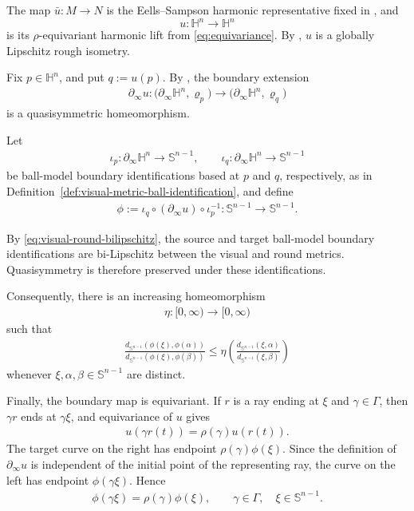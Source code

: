 \documentclass[11pt]{amsart}
\newcommand{\SuggestedDelete}[1]{{\hypersetup{linkcolor=red,citecolor=red,urlcolor=red}\color{red}#1}}
\newcommand{\ReviewUnusedLabel}[1]{%
  \par\noindent
  \SuggestedDelete{\textup{\scriptsize Unused label: \texttt{\detokenize{\label{#1}}}}}%
  \par}
\theoremstyle{plain}
\theoremstyle{plain}
\theoremstyle{plain}
\newcommand{\Hn}{\mathbb H^n}
\newcommand{\bdry}{\partial_\infty}
\numberwithin{equation}{section}
\begin{document}
The map \(\bar u:M\to N\) is the Eells--Sampson harmonic representative fixed in
, and
\[
u:\Hn\longrightarrow\Hn
\]
is its \(\rho\)-equivariant harmonic lift from
\eqref{eq:equivariance}.  By , \(u\) is a globally
Lipschitz rough isometry.  

Fix \(p\in\Hn\), and put \(q:=u(p)\). By
, the boundary extension
\begin{align}
\bdry u:
\bigl(\bdry\Hn,\varrho_p\bigr)
\longrightarrow
\bigl(\bdry\Hn,\varrho_q\bigr)
\nonumber
\end{align}
is a quasisymmetric homeomorphism.

Let
\begin{align}
\iota_p:\bdry\Hn\longrightarrow\mathbb S^{n-1},
\qquad
\iota_q:\bdry\Hn\longrightarrow\mathbb S^{n-1}
\nonumber
\end{align}
be ball-model boundary identifications based at \(p\) and \(q\),
respectively, as in
Definition~\ref{def:visual-metric-ball-identification}, and define
\begin{align}
\phi:=\iota_q\circ(\bdry u)\circ\iota_p^{-1}:\mathbb S^{n-1}\longrightarrow\mathbb S^{n-1}.
\label{eq:spherical-boundary-map}
\end{align}


By \eqref{eq:visual-round-bilipschitz}, the source and target ball-model
boundary identifications are bi-Lipschitz between the visual and round
metrics.  Quasisymmetry is therefore preserved under these identifications.

Consequently, there is an increasing homeomorphism
\begin{align}
\eta:[0,\infty)\longrightarrow[0,\infty)
\nonumber
\end{align}
such that
\begin{align}
\frac{d_{ \mathbb{S}^{n-1}}(\phi(\xi),\phi(\alpha))}
     {d_{ \mathbb{S}^{n-1}}(\phi(\xi),\phi(\beta))}
\leq
\eta\!\left(
\frac{d_{ \mathbb{S}^{n-1}}(\xi,\alpha)}{d_{ \mathbb{S}^{n-1}}(\xi,\beta)}
\right)
\label{eq:qs_sphere}
\end{align}
whenever \(\xi,\alpha,\beta\in \mathbb{S}^{n-1}\) are distinct.

Finally, the boundary map is equivariant.  If \(r\) is a ray ending at
\(\xi\) and $\gamma\in \Gamma$, then \(\gamma r\) ends at \(\gamma\xi\), and equivariance of
\(u\) gives
\begin{align}
u(\gamma r(t))=\rho(\gamma)u(r(t)).
\nonumber
\end{align}
The target curve on the right has endpoint
\(\rho(\gamma)\phi(\xi)\).  Since the definition of \(\bdry u\) is
independent of the initial point of the representing ray, the curve on
the left has endpoint \(\phi(\gamma\xi)\).  Hence
\begin{align}
\phi(\gamma\xi)=\rho(\gamma)\phi(\xi),
\qquad
\gamma\in\Gamma,
\quad
\xi\in \mathbb{S}^{n-1}.
\nonumber
\end{align}
\end{document}
